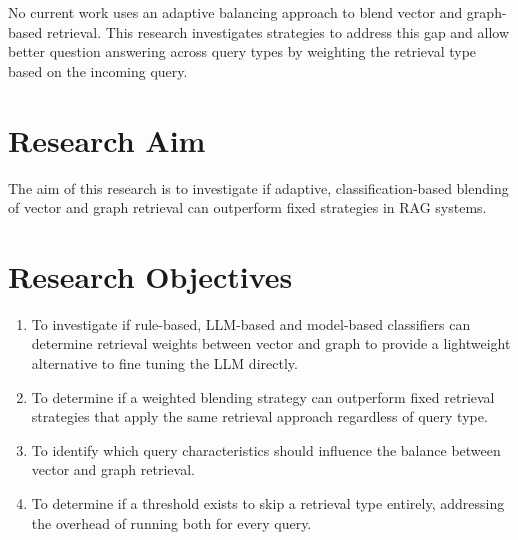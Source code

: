 No current work uses an adaptive balancing approach to blend vector and graph-based retrieval. This research investigates strategies to address this gap and allow better question answering across query types by weighting the retrieval type based on the incoming query.

\section{Research Aim} 
The aim of this research is to investigate if adaptive, classification-based blending of vector and graph retrieval can  outperform fixed strategies in RAG systems.

\section{Research Objectives}
\begin{enumerate} 
    \item To investigate if rule-based, LLM-based and model-based classifiers can determine retrieval weights between vector and graph to provide a lightweight alternative to fine tuning the LLM directly.
    \item To determine if a weighted blending strategy can outperform fixed retrieval strategies that apply the same retrieval approach regardless of query type. 
    \item To identify which query characteristics should influence the balance between vector and graph retrieval.
    \item To determine if a threshold exists to skip a retrieval type entirely, addressing the overhead of running both for every query.
\end{enumerate}